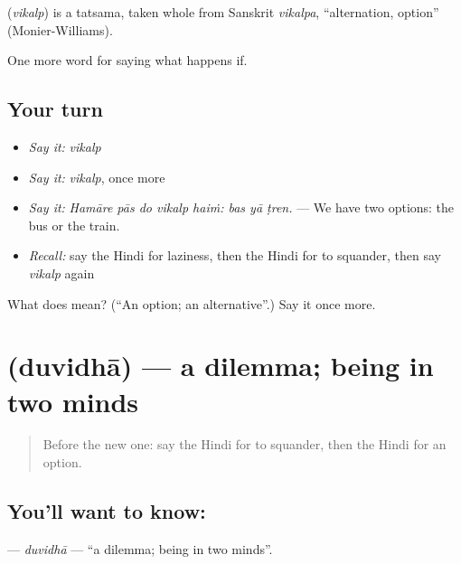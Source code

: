 \begin{cousinweb}
\textbf{} (\emph{vikalp}) is a tatsama, taken whole from Sanskrit \emph{vikalpa}, \textquotedblleft{}alternation, option\textquotedblright{} (Monier-Williams).
\end{cousinweb}

\begin{grammarlens}[title={What you've built}]
One more word for saying what happens if.
\end{grammarlens}

\subsection*{Your turn}
\begin{itemize}
\raggedright
  \item \emph{Say it:} \emph{vikalp}
  \item \emph{Say it:} \emph{vikalp}, once more
  \item \emph{Say it:} \emph{Hamāre pās do vikalp haiṁ: bas yā ṭren.} — We have two options: the bus or the train.
  \item \emph{Recall:} say the Hindi for laziness, then the Hindi for to squander, then say \emph{vikalp} again
\end{itemize}

\begin{tcolorbox}[breakable,colback=teal!4,colframe=teal!35!black,title={Before you move on}]
What does  mean? (\textquotedblleft{}An option; an alternative\textquotedblright{}.) Say it once more.
\end{tcolorbox}
\section[\texorpdfstring{\hi{दुविधा} (duvidhā)}{दुविधा (duvidhā)}]{ (duvidhā) — a dilemma; being in two minds}

\label{lesson:HI-C549-duvidha}



\begin{quote}
Before the new one: say the Hindi for to squander, then the Hindi for an option.
\end{quote}

\subsection*{You'll want to know: }
\textbf{} — \emph{duvidhā} — \textquotedblleft{}a dilemma; being in two minds\textquotedblright{}.

